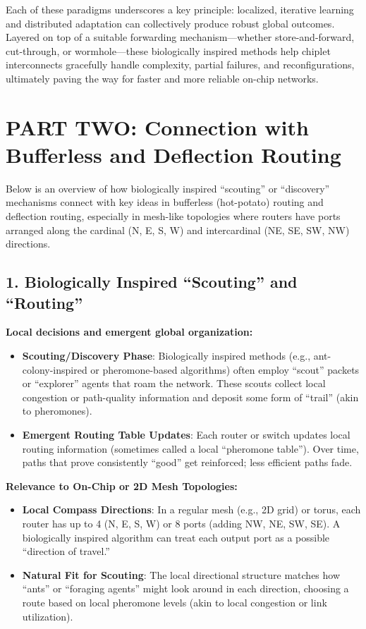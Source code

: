 \documentclass[../OAE-SPEC-MAIN.tex]{subfiles}
\begin{document}
Each of these paradigms underscores a key principle: localized, iterative learning and distributed adaptation can collectively produce robust global outcomes. Layered on top of a suitable forwarding mechanism—whether store-and-forward, cut-through, or wormhole—these biologically inspired methods help chiplet interconnects gracefully handle complexity, partial failures, and reconfigurations, ultimately paving the way for faster and more reliable on-chip networks.

\newpage

\section*{PART TWO: Connection with Bufferless and Deflection Routing}

Below is an overview of how biologically inspired “scouting” or “discovery” mechanisms connect with key ideas in bufferless (hot-potato) routing and deflection routing, especially in mesh-like topologies where routers have ports arranged along the cardinal (N, E, S, W) and intercardinal (NE, SE, SW, NW) directions.

\subsection*{1. Biologically Inspired “Scouting” and “Routing”}

\textbf{Local decisions and emergent global organization:}
\begin{itemize}
    \item \textbf{Scouting/Discovery Phase}: Biologically inspired methods (e.g., ant-colony-inspired or pheromone-based algorithms) often employ “scout” packets or “explorer” agents that roam the network. These scouts collect local congestion or path-quality information and deposit some form of “trail” (akin to pheromones).
    \item \textbf{Emergent Routing Table Updates}: Each router or switch updates local routing information (sometimes called a local “pheromone table”). Over time, paths that prove consistently “good” get reinforced; less efficient paths fade.
\end{itemize}

\textbf{Relevance to On-Chip or 2D Mesh Topologies:}
\begin{itemize}
    \item \textbf{Local Compass Directions}: In a regular mesh (e.g., 2D grid) or torus, each router has up to 4 (N, E, S, W) or 8 ports (adding NW, NE, SW, SE). A biologically inspired algorithm can treat each output port as a possible “direction of travel.”
    \item \textbf{Natural Fit for Scouting}: The local directional structure matches how “ants” or “foraging agents” might look around in each direction, choosing a route based on local pheromone levels (akin to local congestion or link utilization).
\end{itemize}
\end{document}
